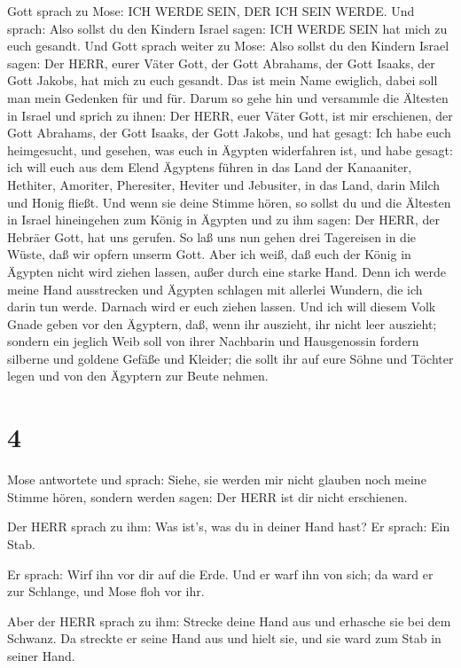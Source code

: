  Gott sprach zu Mose: ICH WERDE SEIN, DER ICH SEIN WERDE.
Und sprach: Also sollst du den Kindern Israel sagen: ICH WERDE SEIN hat
mich zu euch gesandt.  Und Gott sprach weiter zu Mose: Also
sollst du den Kindern Israel sagen: Der HERR, eurer Väter Gott, der Gott
Abrahams, der Gott Isaaks, der Gott Jakobs, hat mich zu euch gesandt.
Das ist mein Name ewiglich, dabei soll man mein Gedenken für und für.
 Darum so gehe hin und versammle die Ältesten in Israel und
sprich zu ihnen: Der HERR, euer Väter Gott, ist mir erschienen, der Gott
Abrahams, der Gott Isaaks, der Gott Jakobs, und hat gesagt: Ich habe
euch heimgesucht, und gesehen, was euch in Ägypten widerfahren ist,
 und habe gesagt: ich will euch aus dem Elend Ägyptens
führen in das Land der Kanaaniter, Hethiter, Amoriter, Pheresiter,
Heviter und Jebusiter, in das Land, darin Milch und Honig fließt.
 Und wenn sie deine Stimme hören, so sollst du und die
Ältesten in Israel hineingehen zum König in Ägypten und zu ihm sagen:
Der HERR, der Hebräer Gott, hat uns gerufen. So laß uns nun gehen drei
Tagereisen in die Wüste, daß wir opfern unserm Gott.  Aber
ich weiß, daß euch der König in Ägypten nicht wird ziehen lassen, außer
durch eine starke Hand.  Denn ich werde meine Hand
ausstrecken und Ägypten schlagen mit allerlei Wundern, die ich darin tun
werde. Darnach wird er euch ziehen lassen.  Und ich will
diesem Volk Gnade geben vor den Ägyptern, daß, wenn ihr auszieht, ihr
nicht leer auszieht;  sondern ein jeglich Weib soll von
ihrer Nachbarin und Hausgenossin fordern silberne und goldene Gefäße und
Kleider; die sollt ihr auf eure Söhne und Töchter legen und von den
Ägyptern zur Beute nehmen.

\hypertarget{section-3}{%
\section{4}\label{section-3}}

 Mose antwortete und sprach: Siehe, sie werden mir nicht
glauben noch meine Stimme hören, sondern werden sagen: Der HERR ist dir
nicht erschienen.

 Der HERR sprach zu ihm: Was ist's, was du in deiner Hand
hast? Er sprach: Ein Stab.

 Er sprach: Wirf ihn vor dir auf die Erde. Und er warf ihn
von sich; da ward er zur Schlange, und Mose floh vor ihr.

 Aber der HERR sprach zu ihm: Strecke deine Hand aus und
erhasche sie bei dem Schwanz. Da streckte er seine Hand aus und hielt
sie, und sie ward zum Stab in seiner Hand.

